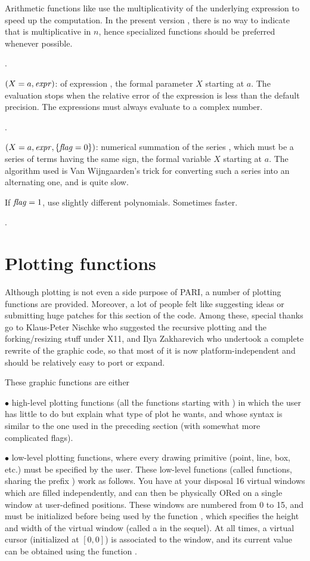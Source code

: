 Arithmetic functions like  use the multiplicativity of the
underlying expression to speed up the computation. In the present version
\vers, there is no way to indicate that  is multiplicative in
$n$, hence specialized functions should be preferred whenever possible.

.

$(X=a,\hbox{\it expr\/})$:  of expression
, the formal parameter $X$ starting at $a$. The evaluation stops
when the relative error of the expression is less than the default precision.
The expressions must always evaluate to a complex number.

.

$(X=a,\hbox{\it expr\/},\{\hbox{\it f\kern0pt lag\/}=0\})$: numerical summation of the
series , which must be a series of terms having the same sign,
the formal
variable $X$ starting at $a$. The algorithm used is Van Wijngaarden's trick
for converting such a series into an alternating one, and is quite slow.

If $\hbox{\it f\kern0pt lag\/}=1$, use slightly different polynomials. Sometimes faster.

.

\section{Plotting functions}

  Although plotting is not even a side purpose of PARI, a number of plotting
functions are provided. Moreover, a lot of people felt like suggesting
ideas or submitting huge patches for this section of the code. Among these,
special thanks go to Klaus-Peter Nischke who suggested the recursive plotting
and the forking/resizing stuff under X11, and Ilya Zakharevich who
undertook a complete rewrite of the graphic code, so that most of it is now
platform-independent and should be relatively easy to port or expand.

These graphic functions are either

$\bullet$ high-level plotting functions (all the functions starting with
) in which the user has little to do but explain what type of plot
he wants, and whose syntax is similar to the one used in the preceding
section (with somewhat more complicated flags).

$\bullet$ low-level plotting functions, where every drawing primitive (point,
line, box, etc.) must be specified by the user. These low-level functions
(called  functions, sharing the prefix ) work as
follows. You have at your disposal 16 virtual windows which are filled
independently, and can then be physically ORed on a single window at
user-defined positions. These windows are numbered from 0 to 15, and must be
initialized before being used by the function , which specifies
the height and width of the virtual window (called a  in the
sequel). At all times, a virtual cursor (initialized at $[0,0]$) is
associated to the window, and its current value can be obtained using the
function .

